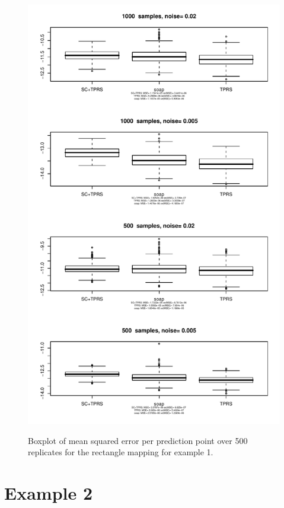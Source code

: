 \documentclass[a4paper,10pt]{amsart}
\begin{document}
\begin{figure}[p]
\centering
\includegraphics[width=5in]{figs-otherdomains/fig9-rect-boxplot.pdf} \\
\caption{Boxplot of mean squared error per prediction point over 500 replicates for the rectangle mapping for example 1. }
\label{fig9-rect-boxplots}
\end{figure}








\section{Example 2}
\end{document}
